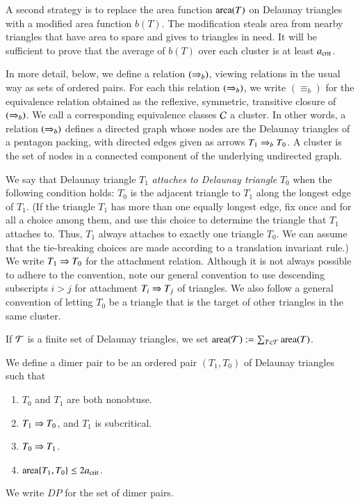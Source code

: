 A second strategy is to replace the area function ${\operatorname{area}}(T)$ on
Delaunay triangles with a modified area function $b(T)$.  The
modification steals area from nearby triangles that have area to spare
and gives to triangles in need.  It will be sufficient to prove that
the average of $b(T)$ over each cluster is at least $a_\text{crit}$.

In more detail, below, we define a  relation $(\Rightarrow_{b})$, viewing
relations in the usual way as sets of ordered pairs.  For each
this relation $(\Rightarrow_{b})$, we write ${(\equiv_{b})}$ for the equivalence
relation obtained as the reflexive, symmetric, transitive closure of
$(\Rightarrow_{b})$.  We call a corresponding equivalence classes $\mathcal C$ a
cluster.  In other words, a relation $(\Rightarrow_{b})$ defines a directed
graph whose nodes are the Delaunay triangles of a pentagon packing,
with directed edges given as arrows $T_1\Rightarrow_{b} T_0$.  A cluster
is the set of nodes in a connected component of the underlying
undirected graph.

We say that Delaunay triangle $T_1$ {\it attaches to Delaunay
  triangle} $T_0$ when the following condition holds: $T_0$ is the
adjacent triangle to $T_1$ along the longest edge of $T_1$.  (If the
triangle $T_1$ has more than one equally longest edge, fix once and
for all a choice among them, and use this choice to determine the
triangle that $T_1$ attaches to.  Thus, $T_1$ always attaches to
exactly one triangle $T_0$.  We can assume that the tie-breaking
choices are made according to a translation invariant rule.)  We write
$T_1 \Rightarrow T_0$ for the attachment relation.  Although it is not always
possible to adhere to the convention, note our general convention to
use descending subscripts $i > j$ for attachment $T_i\Rightarrow T_j$ of
triangles.  We also follow a general convention of letting $T_0$ be
a triangle that is the target of other triangles in the same cluster.


If $\mathcal T$ is a finite set of Delaunay triangles, we set
${\operatorname{area}}(\mathcal T):=\sum_{T\in\mathcal T} {\operatorname{area}}(T)$.

\begin{definition}
  We define a dimer pair to be an ordered pair $(T_1,T_0)$ of Delaunay
  triangles such that
\begin{enumerate}
\item $T_0$ and $T_1$ are both nonobtuse.
\item $T_1\Rightarrow T_0$, and $T_1$ is subcritical.
\item $T_0 \Rightarrow T_1$.
\item ${\operatorname{area}}\{T_1,T_0\} \le 2a_\text{crit}$.
\end{enumerate}
We write $DP$ for the set of dimer pairs.
\end{definition}

